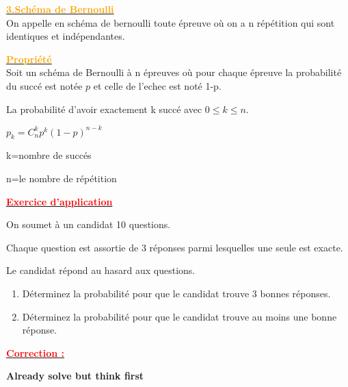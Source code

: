 \documentclass[12pt]{article}
\begin{document}
\underline{\textbf{\textcolor{orange}{3.Schéma de Bernoulli}}}\\
On appelle en schéma de bernoulli toute épreuve où on a n répétition qui sont identiques et indépendantes.

\underline{\textbf{\textcolor{orange}{Propriété}}}\\
Soit un schéma de Bernoulli à n épreuves où pour chaque épreuve la probabilité du succé est notée $p$ et celle de l'echec est noté 1-p. 

La probabilité d'avoir exactement k succé avec $0\leq k\leq n$.

$p_{k}=C^{k}_{n}p^{k}(1-p)^{n-k}$

k=nombre de succés

n=le nombre de répétition

\underline{\textbf{\textcolor{red}{Exercice d'application}}}

On soumet à un candidat 10 questions.

Chaque question est assortie de 3 réponses parmi lesquelles une seule est exacte.

Le candidat répond au hasard aux questions.

\begin{enumerate}
    \item Déterminez la probabilité pour que le candidat trouve 3 bonnes réponses.
    
    \item Déterminez la probabilité pour que le candidat trouve au moins une bonne réponse.
\end{enumerate}

\underline{\textbf{\textcolor{red}{Correction :}}}

\textbf{Already solve but think first}


	
    
\end{document}
